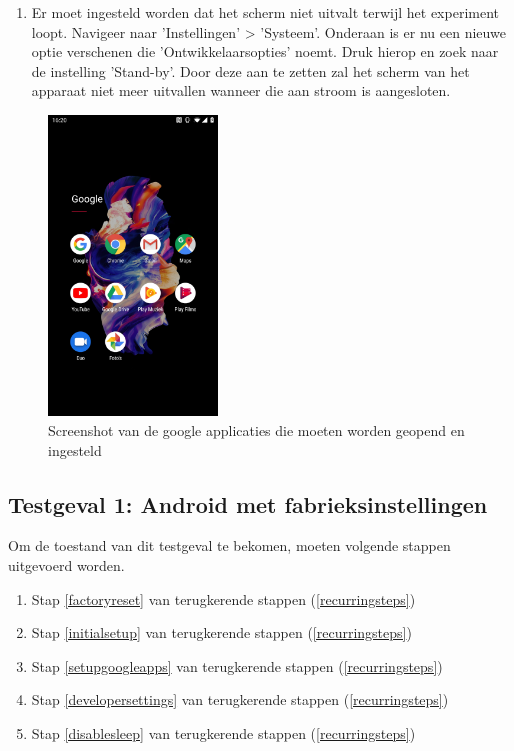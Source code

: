 \begin{enumerate}
    \item 
    \label{disablesleep}
    Er moet ingesteld worden dat het scherm niet uitvalt terwijl het experiment loopt. Navigeer naar 'Instellingen' > 'Systeem'. Onderaan is er nu een nieuwe optie verschenen die 'Ontwikkelaarsopties' noemt. Druk hierop en zoek naar de instelling 'Stand-by'. Door deze aan te zetten zal het scherm van het apparaat niet meer uitvallen wanneer die aan stroom is aangesloten.
\end{enumerate}

\begin{figure}
    \centering
    \includegraphics[width=0.4\textwidth]{img/googleapps.jpg}
    \caption{Screenshot van de google applicaties die moeten worden geopend en ingesteld}
    \label{fig:googleapps}
\end{figure}

\subsection{Testgeval 1: Android met fabrieksinstellingen}

Om de toestand van dit testgeval te bekomen, moeten volgende stappen uitgevoerd worden.
\begin{enumerate}
    \item Stap \ref{factoryreset} van terugkerende stappen (\ref{recurringsteps})
    \item Stap \ref{initialsetup} van terugkerende stappen (\ref{recurringsteps})
    \item Stap \ref{setupgoogleapps} van terugkerende stappen (\ref{recurringsteps})
    \item Stap \ref{developersettings} van terugkerende stappen (\ref{recurringsteps})
    \item Stap \ref{disablesleep} van terugkerende stappen (\ref{recurringsteps})
\end{enumerate}


